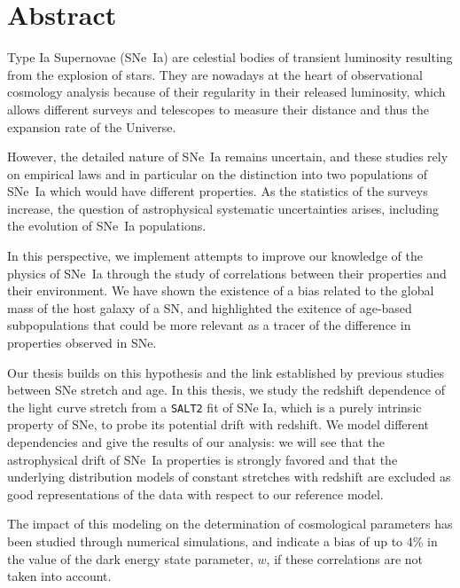 \documentclass[../main/main.tex]{subfiles}
\begin{document}
\chapter*{Abstract}\label{ch}

Type Ia Supernovae (SNe~Ia) are celestial bodies of transient luminosity
resulting from the explosion of stars. They are nowadays at the heart of
observational cosmology analysis because of their regularity in their released
luminosity, which allows different surveys and telescopes to measure their
distance and thus the expansion rate of the Universe.

However, the detailed nature of SNe~Ia remains uncertain, and these studies rely
on empirical laws and in particular on the distinction into two populations of
SNe~Ia which would have different properties. As the statistics of the surveys
increase, the question of astrophysical systematic uncertainties arises,
including the evolution of SNe~Ia populations.

In this perspective, we implement attempts to improve our knowledge of the
physics of SNe~Ia through the study of correlations between their properties and
their environment. We have shown the existence of a bias related to the global
mass of the host galaxy of a SN, and highlighted the exitence of age-based
subpopulations that could be more relevant as a tracer of the difference in
properties observed in SNe.

Our thesis builds on this hypothesis and the link established by previous
studies between SNe stretch and age. In this thesis, we study the redshift
dependence of the light curve stretch from a \texttt{SALT2} fit of SNe Ia, which
is a purely intrinsic property of SNe, to probe its potential drift with
redshift. We model different dependencies and give the results of our analysis:
we will see that the astrophysical drift of SNe~Ia properties is strongly
favored and that the underlying distribution models of constant stretches with
redshift are excluded as good representations of the data with respect to our
reference model.

The impact of this modeling on the determination of cosmological parameters has
been studied through numerical simulations, and indicate a bias of up to 4\% in
the value of the dark energy state parameter, $w$, if these correlations are not
taken into account.
\end{document}
